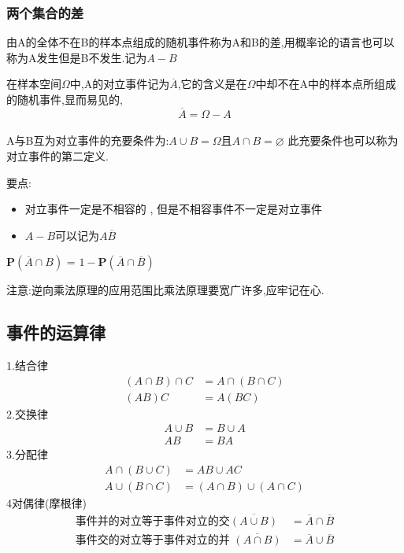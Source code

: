\subsubsection*{两个集合的差}
由A的全体不在B的样本点组成的随机事件称为A和B的差,用概率论的语言也可以称为A发生但是B不发生.记为\(A - B \)
\begin{Definition}[对立事件]
    在样本空间\(\Omega\)中,A的对立事件记为\(\overline{A}\),它的含义是在\(\Omega\)中却不在A中的样本点所组成的随机事件,显而易见的,\[\overline{A} = \Omega - A\]\\
    A与B互为对立事件的充要条件为:\(A\cup B = \Omega\)且\(A \cap B = \varnothing \) 此充要条件也可以称为对立事件的第二定义.
\end{Definition}
要点: 
\begin{itemize}
    \item 对立事件一定是不相容的 , 但是不相容事件不一定是对立事件\\
    \item \(A - B \)可以记为\(A\overline{B}\)
\end{itemize}
\begin{Theorem}[逆向乘法原理]
    \(\mathbf{P}(\overline{A} \cap B)\) = \(1- \mathbf{P}(\overline{A} \cap \overline{B})\)
\end{Theorem}
注意:逆向乘法原理的应用范围比乘法原理要宽广许多,应牢记在心.
\subsection{事件的运算律}
1.结合律
\begin{align}
    (A \cap B) \cap C &= A \cap (B \cap C) \\
    (AB)C &= A(BC)
\end{align}
2.交换律
\begin{align}
    A\cup B &=B \cup A \\
    AB&=BA
\end{align}
3.分配律
\begin{align}
    A\cap (B \cup C) &= AB \cup AC \\
    A\cup(B\cap C ) &= (A \cap B) \cup (A\cap C)
\end{align}
4对偶律(摩根律)
\begin{align}
    \textbf{事件并的对立等于事件对立的交}\overline{(A\cup B)} &= \overline{A} \cap \overline{B} \\
    \textbf{事件交的对立等于事件对立的并 } \overline{(A \cap B )} &= \overline{A} \cup \overline{B}
\end{align}
